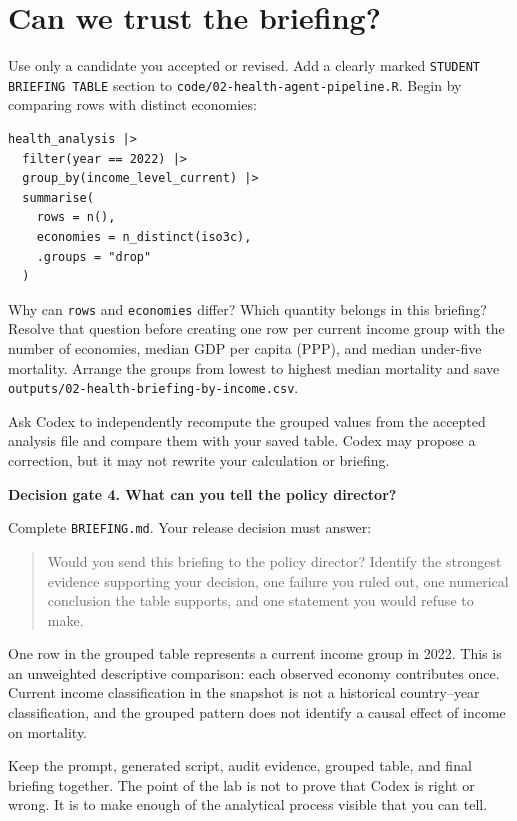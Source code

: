 \documentclass[11pt]{article}
\newcommand{\gate}[2]{\medskip\noindent\textbf{Decision gate #1. #2}\par}
\newcommand{\file}[1]{\nolinkurl{#1}}
\begin{document}
\newpage
\section*{Can we trust the briefing?}

Use only a candidate you accepted or revised. Add a clearly marked
\texttt{STUDENT BRIEFING TABLE} section to
\file{code/02-health-agent-pipeline.R}. Begin by comparing rows with distinct
economies:

\begin{lstlisting}
health_analysis |>
  filter(year == 2022) |>
  group_by(income_level_current) |>
  summarise(
    rows = n(),
    economies = n_distinct(iso3c),
    .groups = "drop"
  )
\end{lstlisting}

Why can \texttt{rows} and \texttt{economies} differ? Which quantity belongs in
this briefing? Resolve that question before creating one row per current income
group with the number of economies, median GDP per capita (PPP), and median
under-five mortality. Arrange the groups from lowest to highest median
mortality and save \file{outputs/02-health-briefing-by-income.csv}.

Ask Codex to independently recompute the grouped values from the accepted
analysis file and compare them with your saved table. Codex may propose a
correction, but it may not rewrite your calculation or briefing.

\gate{4}{What can you tell the policy director?}

Complete \file{BRIEFING.md}. Your release decision must answer:

\begin{quote}
Would you send this briefing to the policy director? Identify the strongest
evidence supporting your decision, one failure you ruled out, one numerical
conclusion the table supports, and one statement you would refuse to make.
\end{quote}

One row in the grouped table represents a current income group in 2022. This
is an unweighted descriptive comparison: each observed economy contributes
once. Current income classification in the snapshot is not a historical
country--year classification, and the grouped pattern does not identify a
causal effect of income on mortality.

Keep the prompt, generated script, audit evidence, grouped table, and final
briefing together. The point of the lab is not to prove that Codex is right or
wrong. It is to make enough of the analytical process visible that you can tell.
\end{document}
